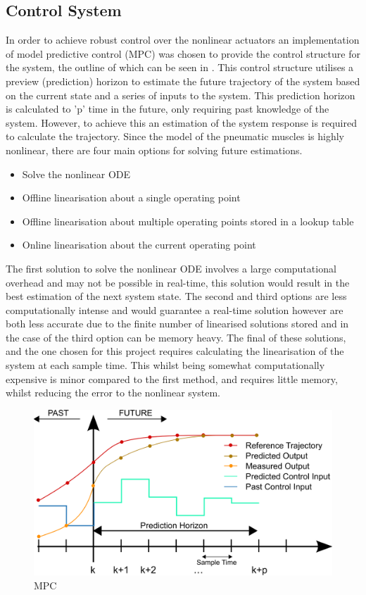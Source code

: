 \documentclass[11pt,a4paper]{article}
\begin{document}
\subsection{Control System}
\label{sub:control_system}
In order to achieve robust control over the nonlinear actuators an implementation of model predictive control (MPC) was chosen to provide the control structure for the system, the outline of which can be seen in . This control structure utilises a preview (prediction) horizon to estimate the future trajectory of the system based on the current state and a series of inputs to the system. This prediction horizon is calculated to 'p' time in the future, only requiring past knowledge of the system. However, to achieve this an estimation of the system response is required to calculate the trajectory. Since the model of the pneumatic muscles is highly nonlinear, there are four main options for solving future estimations.
\begin{itemize}
    \item Solve the nonlinear ODE
    \item Offline linearisation about a single operating point
    \item Offline linearisation about multiple operating points stored in a lookup table
    \item Online linearisation about the current operating point
\end{itemize}

The first solution to solve the nonlinear ODE involves a large computational overhead and may not be possible in real-time, this solution would result in the best estimation of the next system state. The second and third options are less computationally intense and would guarantee a real-time solution however are both less accurate due to the finite number of linearised solutions stored and in the case of the third option can be memory heavy. The final of these solutions, and the one chosen for this project requires calculating the linearisation of the system at each sample time. This whilst being somewhat computationally expensive is minor compared to the first method, and requires little memory, whilst reducing the error to the nonlinear system.\newline

\begin{figure}[hbt!]
    \centering
    \includegraphics[scale=0.15]{MPC.png}
    \caption{MPC}
    \label{fig:mpc_chart}
\end{figure}
\end{document}

